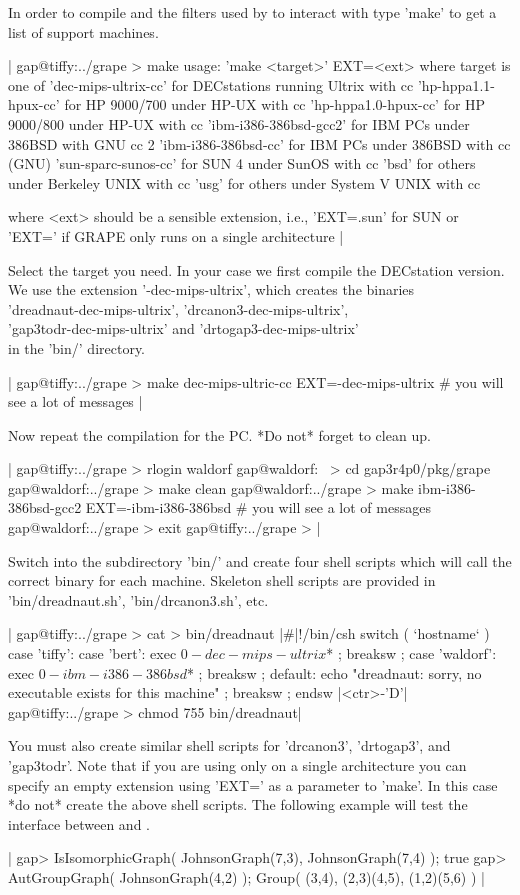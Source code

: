 In order to compile {\nauty} and the filters used by {\GRAPE} to interact
with {\nauty} type 'make' to get a list of support machines.

|    gap@tiffy:../grape > make
    usage: 'make <target>' EXT=<ext> where target is one of
    'dec-mips-ultrix-cc'   for DECstations running Ultrix with cc
    'hp-hppa1.1-hpux-cc'   for HP 9000/700 under HP-UX with cc
    'hp-hppa1.0-hpux-cc'   for HP 9000/800 under HP-UX with cc
    'ibm-i386-386bsd-gcc2' for IBM PCs under 386BSD with GNU cc 2
    'ibm-i386-386bsd-cc'   for IBM PCs under 386BSD with cc (GNU)
    'sun-sparc-sunos-cc'   for SUN 4 under SunOS with cc
    'bsd'                  for others under Berkeley UNIX with cc
    'usg'                  for others under System V UNIX with cc

    where <ext> should be a sensible extension, i.e.,
    'EXT=.sun' for SUN or 'EXT=' if GRAPE only runs
    on a single architecture |

Select the target you need.  In your case we first compile the DECstation
version.   We use  the  extension '-dec-mips-ultrix',  which creates  the
binaries \\
'dreadnaut-dec-mips-ultrix', 'drcanon3-dec-mips-ultrix', \\
'gap3todr-dec-mips-ultrix' and 'drtogap3-dec-mips-ultrix' \\
in the 'bin/' directory.

|    gap@tiffy:../grape > make dec-mips-ultric-cc EXT=-dec-mips-ultrix
    # you will see a lot of messages |

Now repeat the compilation for the PC. *Do not* forget to clean up.

|    gap@tiffy:../grape > rlogin waldorf
    gap@waldorf:~ > cd gap3r4p0/pkg/grape
    gap@waldorf:../grape > make clean
    gap@waldorf:../grape > make ibm-i386-386bsd-gcc2 EXT=-ibm-i386-386bsd
    # you will see a lot of messages
    gap@waldorf:../grape > exit
    gap@tiffy:../grape > |

Switch into  the subdirectory 'bin/'  and create four shell scripts which
will call the correct binary for each machine. Skeleton shell scripts are
provided in 'bin/dreadnaut.sh', 'bin/drcanon3.sh', etc.

|    gap@tiffy:../grape > cat > bin/dreadnaut
    |\#|!/bin/csh
    switch ( `hostname` )
      case 'tiffy':
      case 'bert':
        exec $0-dec-mips-ultrix $* ;
        breaksw ;
      case 'waldorf':
        exec $0-ibm-i386-386bsd $* ;
        breaksw ;
      default:
        echo "dreadnaut: sorry, no executable exists for this machine" ;
        breaksw ;
    endsw
    |<ctr>-'D'|
    gap@tiffy:../grape > chmod 755 bin/dreadnaut|

You  must also create similar  shell scripts for  'drcanon3', 'drtogap3',
and 'gap3todr'.  Note  that if you  are using  {\GRAPE} only on a  single
architecture you  can  specify  an empty  extension  using  'EXT='  as  a
parameter  to 'make'.   In  this  case  *do not*  create the  above shell
scripts.  The  following example will test the interface between {\GRAPE}
and {\nauty}.

|    gap> IsIsomorphicGraph( JohnsonGraph(7,3), JohnsonGraph(7,4) );
    true
    gap> AutGroupGraph( JohnsonGraph(4,2) );
    Group( (3,4), (2,3)(4,5), (1,2)(5,6) ) |
